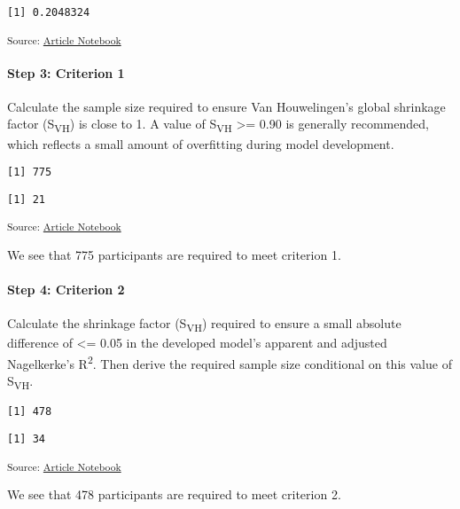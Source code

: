 \documentclass[
  letterpaper,
  DIV=11,
  numbers=noendperiod]{scrartcl}
\let\oldparagraph\paragraph
\renewcommand{\paragraph}[1]{\oldparagraph{#1}\mbox{}}
\begin{document}
\begin{verbatim}
[1] 0.2048324
\end{verbatim}

\textsubscript{Source:
\href{https://AnTangQuoc.github.io/LZD-TP-pred-model/index.qmd.html}{Article
Notebook}}

\paragraph{Step 3: Criterion 1}\label{step-3-criterion-1}

Calculate the sample size required to ensure Van Houwelingen's global
shrinkage factor (S\textsubscript{VH}) is close to 1. A value of
S\textsubscript{VH} \textgreater= 0.90 is generally recommended, which
reflects a small amount of overfitting during model development.

\begin{verbatim}
[1] 775
\end{verbatim}

\begin{verbatim}
[1] 21
\end{verbatim}

\textsubscript{Source:
\href{https://AnTangQuoc.github.io/LZD-TP-pred-model/index.qmd.html}{Article
Notebook}}

We see that 775 participants are required to meet criterion 1.

\paragraph{Step 4: Criterion 2}\label{step-4-criterion-2}

Calculate the shrinkage factor (S\textsubscript{VH}) required to ensure
a small absolute difference of \textless= 0.05 in the developed model's
apparent and adjusted Nagelkerke's R\textsuperscript{2}. Then derive the
required sample size conditional on this value of S\textsubscript{VH}.

\begin{verbatim}
[1] 478
\end{verbatim}

\begin{verbatim}
[1] 34
\end{verbatim}

\textsubscript{Source:
\href{https://AnTangQuoc.github.io/LZD-TP-pred-model/index.qmd.html}{Article
Notebook}}

We see that 478 participants are required to meet criterion 2.
\end{document}
